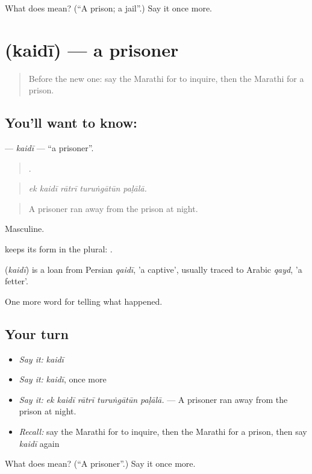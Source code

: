 \begin{tcolorbox}[breakable,colback=teal!4,colframe=teal!35!black,title={Before you move on}]
What does  mean? (\textquotedblleft{}A prison; a jail\textquotedblright{}.) Say it once more.
\end{tcolorbox}
\section[\texorpdfstring{\mr{कैदी} (kaidī)}{कैदी (kaidī)}]{ (kaidī) — a prisoner}

\label{lesson:MR-C290-kaidi}



\begin{quote}
Before the new one: say the Marathi for to inquire, then the Marathi for a prison.
\end{quote}

\subsection*{You'll want to know: }
\textbf{} — \emph{kaidī} — \textquotedblleft{}a prisoner\textquotedblright{}.

\begin{quote}
    .
\end{quote}

\begin{quote}
\emph{ek kaidī rātrī turuṅgātūn paḷālā.}
\end{quote}

\begin{quote}
A prisoner ran away from the prison at night.
\end{quote}

Masculine.

 keeps its form in the plural:  .

\begin{cousinweb}
\textbf{} (\emph{kaidī}) is a loan from Persian \emph{qaidī}, 'a captive', usually traced to Arabic \emph{qayd}, 'a fetter'.
\end{cousinweb}

\begin{grammarlens}[title={What you've built}]
One more word for telling what happened.
\end{grammarlens}

\subsection*{Your turn}
\begin{itemize}
\raggedright
  \item \emph{Say it:} \emph{kaidī}
  \item \emph{Say it:} \emph{kaidī}, once more
  \item \emph{Say it:} \emph{ek kaidī rātrī turuṅgātūn paḷālā.} — A prisoner ran away from the prison at night.
  \item \emph{Recall:} say the Marathi for to inquire, then the Marathi for a prison, then say \emph{kaidī} again
\end{itemize}

\begin{tcolorbox}[breakable,colback=teal!4,colframe=teal!35!black,title={Before you move on}]
What does  mean? (\textquotedblleft{}A prisoner\textquotedblright{}.) Say it once more.
\end{tcolorbox}
